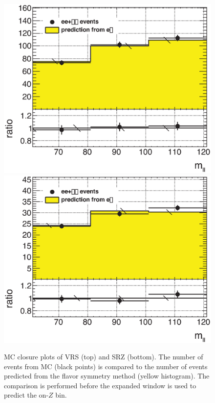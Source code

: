 \begin{centering}
\begin{figure}[bth]
\myfloatalign
\includegraphics[width=.85\linewidth]{figures/fs/ee+mm_ratio_mll_VRZ_widened.eps}
\includegraphics[width=.85\linewidth]{figures/fs/ee+mm_ratio_mll_SRZ_widened.eps}
\caption{MC closure plots of VRS (top) and SRZ (bottom). The number of events from MC (black points) is compared to the number of events predicted from the flavor symmetry method (yellow histogram). The comparison is performed before the expanded \mll window is used to predict the on-$Z$ bin.}
\label{fig:fs_closure}
\end{figure}
\end{centering}

